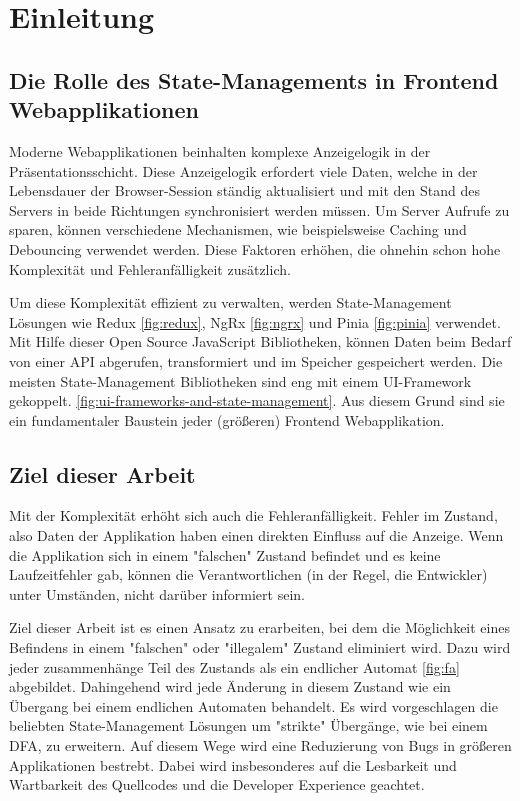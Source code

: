 \chapter{Einleitung}

\section{Die Rolle des State-Managements in Frontend Webapplikationen}

Moderne Webapplikationen beinhalten komplexe Anzeigelogik in der Präsentationsschicht. Diese Anzeigelogik erfordert viele Daten, welche in der Lebensdauer der Browser-Session ständig aktualisiert und mit den Stand des Servers in beide Richtungen synchronisiert werden müssen. Um Server Aufrufe zu sparen, können verschiedene Mechanismen, wie beispielsweise Caching und Debouncing verwendet werden. Diese Faktoren erhöhen, die ohnehin schon hohe Komplexität und Fehleranfälligkeit zusätzlich.

Um diese Komplexität effizient zu verwalten, werden State-Management Lösungen wie Redux \ref{fig:redux}, NgRx \ref{fig:ngrx} und Pinia \ref{fig:pinia} verwendet. Mit Hilfe dieser Open Source JavaScript Bibliotheken, können Daten beim Bedarf von einer API abgerufen, transformiert und im Speicher gespeichert werden. Die meisten State-Management Bibliotheken sind eng mit einem UI-Framework gekoppelt. \ref{fig:ui-frameworks-and-state-management}. Aus diesem Grund sind sie ein fundamentaler Baustein jeder (größeren) Frontend Webapplikation.

\section{Ziel dieser Arbeit}

Mit der Komplexität erhöht sich auch die Fehleranfälligkeit. Fehler im Zustand, also Daten der Applikation haben einen direkten Einfluss auf die Anzeige. Wenn die Applikation sich in einem "falschen" Zustand befindet und es keine Laufzeitfehler gab, können die Verantwortlichen (in der Regel, die Entwickler) unter Umständen, nicht darüber informiert sein. 

Ziel dieser Arbeit ist es einen Ansatz zu erarbeiten, bei dem die Möglichkeit eines Befindens in einem "falschen" oder "illegalem" Zustand eliminiert wird. Dazu wird jeder zusammenhänge Teil des Zustands als ein endlicher Automat \ref{fig:fa} abgebildet. Dahingehend wird jede Änderung in diesem Zustand wie ein Übergang bei einem endlichen Automaten behandelt. Es wird vorgeschlagen die beliebten State-Management Lösungen um "strikte" Übergänge, wie bei einem DFA, zu erweitern. Auf diesem Wege wird eine Reduzierung von Bugs in größeren Applikationen bestrebt. Dabei wird insbesonderes auf die Lesbarkeit und Wartbarkeit des Quellcodes und die Developer Experience geachtet.